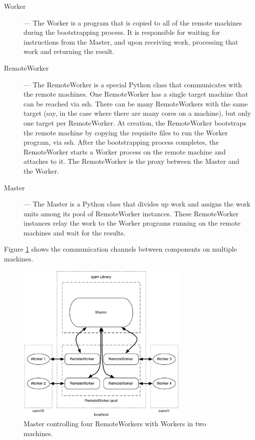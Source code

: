\documentclass[%
  final,
  notitlepage,
  narroweqnarray,
  inline,
]{ieee}
\begin{document}
\begin{description}
  \item[Worker] --- The Worker is a program that is copied to all of the remote
    machines during the bootstrapping process. It is responsible for waiting
    for instructions from the Master, and upon receiving work, processing that
    work and returning the result. \\

  \item[RemoteWorker] --- The RemoteWorker is a special Python class that
    communicates with the remote machines. One RemoteWorker has a single target
    machine that can be reached via ssh. There can be many RemoteWorkers with
    the same target (say, in the case where there are many cores on a machine),
    but only one target per RemoteWorker. At creation, the RemoteWorker
    bootstraps the remote machine by copying the requisite files to run the
    Worker program, via ssh. After the bootstrapping process completes, the
    RemoteWorker starts a Worker process on the remote machine and attaches to
    it. The RemoteWorker is the proxy between the Master and the Worker. \\

  \item[Master] --- The Master is a Python class that divides up work and
    assigns the work units among its pool of RemoteWorker instances. These
    RemoteWorker instances relay the work to the Worker programs running on the
    remote machines and wait for the results. \\
\end{description}

Figure \ref{diagram} shows the communication channels between components on
multiple machines.

\begin{figure}[h!]
  \begin{center}
    \includegraphics[width=3.3in]{fwk_diagram/fwk_diagram.pdf}
  \end{center}
  \caption{Master controlling four RemoteWorkers with Workers in two machines.}
  \label{diagram}
\end{figure}
\end{document}
